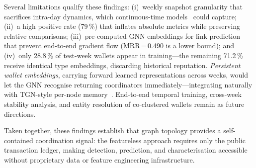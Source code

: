 \documentclass[10pt,journal]{IEEEtran}
\begin{document}
Several limitations qualify these findings: (i)~weekly snapshot
granularity that sacrifices intra-day dynamics, which continuous-time
models~\cite{xu2020tgat,rossi2020tgn,yu2023dygformer} could capture;
(ii)~a high positive rate (79\,\%) that inflates absolute metrics
while preserving relative comparisons;
(iii)~pre-computed GNN embeddings for link prediction that prevent
end-to-end gradient flow (MRR\,=\,0.490 is a lower bound); and
(iv)~only 28.8\,\% of test-week wallets appear in training---the
remaining 71.2\,\% receive identical type embeddings, discarding
historical reputation. \emph{Persistent wallet embeddings}, carrying
forward learned representations across weeks, would let the GNN
recognise returning coordinators immediately---integrating naturally
with TGN-style per-node memory~\cite{rossi2020tgn}. End-to-end
temporal training, cross-week stability analysis, and entity
resolution of co-clustered wallets remain as future directions.

Taken together, these findings establish that graph topology provides a
self-contained coordination signal: the featureless approach requires
only the public transaction ledger, making detection, prediction, and
characterisation accessible without proprietary data or feature
engineering infrastructure.

{\footnotesize


}
\end{document}
